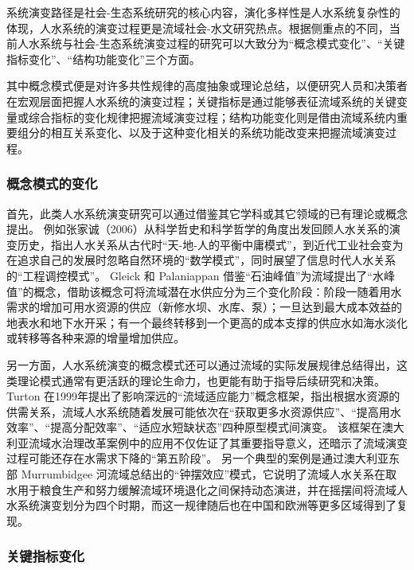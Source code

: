 系统演变路径是社会-生态系统研究的核心内容，演化多样性是人水系统复杂性的体现，人水系统的演变过程更是流域社会-水文研究热点。根据侧重点的不同，当前人水系统与社会-生态系统演变过程的研究可以大致分为“概念模式变化”、“关键指标变化”、“结构功能变化”三个方面。

其中概念模式便是对许多共性规律的高度抽象或理论总结，以便研究人员和决策者在宏观层面把握人水系统的演变过程；关键指标是通过能够表征流域系统的关键变量或综合指标的变化规律把握流域演变过程；结构功能变化则是借由流域系统内重要组分的相互关系变化、以及于这种变化相关的系统功能改变来把握流域演变过程。

\subsubsection*{概念模式的变化}

首先，此类人水系统演变研究可以通过借鉴其它学科或其它领域的已有理论或概念提出。
例如张家诚（2006）从科学哲史和科学哲学的角度出发回顾人水关系的演变历史，指出人水关系从古代时“天-地-人的平衡中庸模式”，到近代工业社会变为在追求自己的发展时忽略自然环境的“数学模式”，同时展望了信息时代人水关系的“工程调控模式”\cite{zhang2006}。
Gleick 和 Palaniappan 借鉴“石油峰值”为流域提出了“水峰值”的概念，借助该概念可将流域潜在水供应分为三个变化阶段：阶段一随着用水需求的增加可用水资源的供应（新修水坝、水库、泵）；一旦达到最大成本效益的地表水和地下水开采；有一个最终转移到一个更高的成本支撑的供应水如海水淡化或转移等各种来源的增量增加供应\cite{gleick2010}。

另一方面，人水系统演变的概念模式还可以通过流域的实际发展规律总结得出，这类理论模式通常有更活跃的理论生命力，也更能有助于指导后续研究和决策。
Turton 在1999年提出了影响深远的“流域适应能力”概念框架，指出根据水资源的供需关系，流域人水系统随着发展可能依次在“获取更多水资源供应”、“提高用水效率”、“提高分配效率”、“适应水短缺状态”四种原型模式间演变\cite{turton1999}。
该框架在澳大利亚流域水治理改革案例中的应用不仅佐证了其重要指导意义，还暗示了流域演变过程可能还存在水需求下降的“第五阶段”\cite{loch2020}。
另一个典型的案例是通过澳大利亚东部 Murrumbidgee 河流域总结出的“钟摆效应”模式，它说明了流域人水关系在取水用于粮食生产和努力缓解流域环境退化之间保持动态演进，并在摇摆间将流域人水系统演变划分为四个时期\cite{kandasamy2014, roobavannan2017}，而这一规律随后也在中国和欧洲等更多区域得到了复现\cite{han2017, mostert2018}。

\subsubsection*{关键指标变化}

